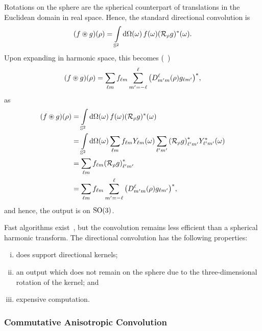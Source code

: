 Rotations on the sphere are the spherical counterpart of translations in the Euclidean domain in real space.
Hence, the standard directional convolution is
%
\begin{equation}\label{eq:chapter3_directional_convolution}
	(f \circledast g)(\rho)
	= \integrateSphere{\omega} \pixel{f} \pixel{\conj{(\rotation{\rho}g)}}.
\end{equation}
%
Upon expanding in harmonic space, this becomes (\eg{}~\autocite{McEwen2007,Wandelt2001})
%
\begin{equation}
	(f \circledast g) (\rho)
	= \harmonicSum \harmonic{f} \sum\limits_{m'=-\ell}^{\ell} \conj{\big(\wigner{\ell}{m'}{m}(\rho) g_{\ell m'}\big)},
\end{equation}
%
as
%
\begin{align}
	(f \circledast g)(\rho)
	 & = \integrateSphere{\omega} \pixel{f} \pixel{\conj{(\rotation{\rho}g)}} \nonumber{}                                                                                           \\
	 & = \integrateSphere{\omega} \harmonicSum \harmonic{f} \pixel{\harmonic{Y}} \harmonicSum['] \conj{\harmonic[']{(\rotation{\rho}g)}} \pixel{\conj{\harmonic[']{Y}}} \nonumber{} \\
	 & = \harmonicSum \harmonic{f} \conj{\harmonic[']{(\rotation{\rho}g)}} \nonumber{}                                                                                              \\
	 & = \harmonicSum \harmonic{f} \sum\limits_{m'=-\ell}^{\ell} \conj{\big(\wigner{\ell}{m'}{m}(\rho) g_{\ell m'}\big)},
\end{align}
%
and hence, the output is on \(\rotationGroup{}\).

Fast algorithms exist~\autocite{McEwen2007,Wandelt2001,Wiaux2007,McEwen2013}, but the convolution remains less efficient than a spherical harmonic transform.
The directional convolution has the following properties:
%
\begin{enumerate}[(i),nosep]
	\item does support directional kernels;
	\item an output which does not remain on the sphere due to the three-dimensional rotation of the kernel; and
	\item expensive computation.
\end{enumerate}

\subsubsection{Commutative Anisotropic Convolution}


